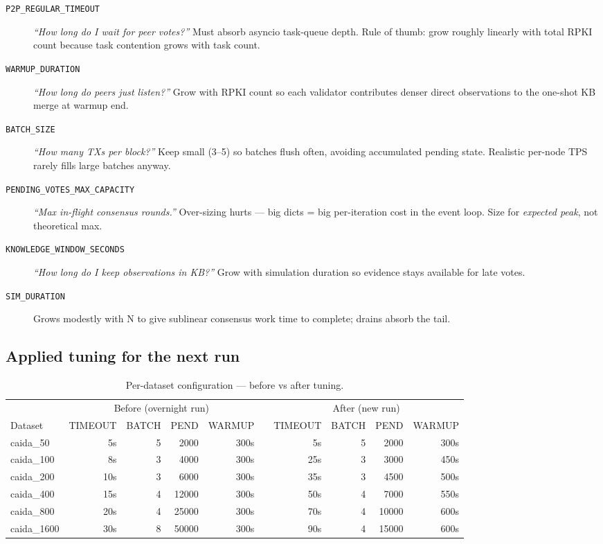 \documentclass[10pt,a4paper]{article}
\begin{document}
\begin{description}
\item[\texttt{P2P\_REGULAR\_TIMEOUT}] \emph{``How long do I wait for
  peer votes?''}  Must absorb asyncio task-queue depth.  Rule of thumb:
  grow roughly linearly with total RPKI count because task contention
  grows with task count.
\item[\texttt{WARMUP\_DURATION}] \emph{``How long do peers just
  listen?''}  Grow with RPKI count so each validator contributes denser
  direct observations to the one-shot KB merge at warmup end.
\item[\texttt{BATCH\_SIZE}] \emph{``How many TXs per block?''}  Keep
  small (3--5) so batches flush often, avoiding accumulated pending
  state.  Realistic per-node TPS rarely fills large batches anyway.
\item[\texttt{PENDING\_VOTES\_MAX\_CAPACITY}] \emph{``Max in-flight
  consensus rounds.''}  Over-sizing hurts --- big dicts = big per-iteration
  cost in the event loop.  Size for \emph{expected peak}, not
  theoretical max.
\item[\texttt{KNOWLEDGE\_WINDOW\_SECONDS}] \emph{``How long do I keep
  observations in KB?''}  Grow with simulation duration so evidence
  stays available for late votes.
\item[\texttt{SIM\_DURATION}] Grows modestly with N to give sublinear
  consensus work time to complete; drains absorb the tail.
\end{description}

\subsection*{Applied tuning for the next run}

\begin{table}[h]
\centering
\small
\caption{Per-dataset configuration --- before vs after tuning.}
\begin{tabular}{lrrrrr rrrr}
\toprule
 & \multicolumn{4}{c}{Before (overnight run)} & & \multicolumn{4}{c}{After (new run)} \\
\cmidrule(lr){2-5}\cmidrule(lr){7-10}
Dataset & TIMEOUT & BATCH & PEND & WARMUP & & TIMEOUT & BATCH & PEND & WARMUP \\
\midrule

caida\_50 & 5s & 5 & 2000 & 300s & & 5s & 5 & 2000 & 300s \\
caida\_100 & 8s & 3 & 4000 & 300s & & 25s & 3 & 3000 & 450s \\
caida\_200 & 10s & 3 & 6000 & 300s & & 35s & 3 & 4500 & 500s \\
caida\_400 & 15s & 4 & 12000 & 300s & & 50s & 4 & 7000 & 550s \\
caida\_800 & 20s & 4 & 25000 & 300s & & 70s & 4 & 10000 & 600s \\
caida\_1600 & 30s & 8 & 50000 & 300s & & 90s & 4 & 15000 & 600s \\
\bottomrule
\end{tabular}
\end{table}
\end{document}

